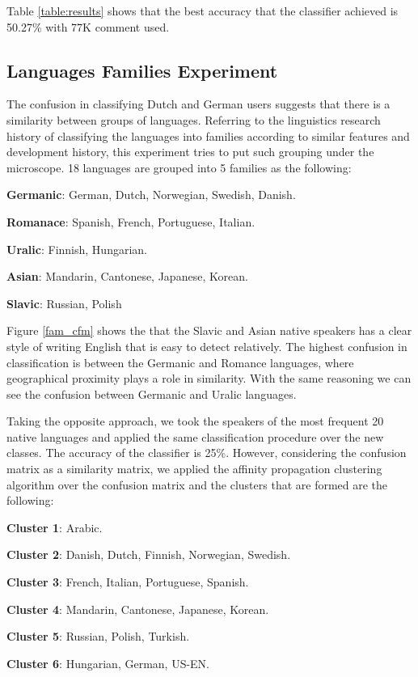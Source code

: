 \documentclass[10pt,a5paper,twoside]{article}
\begin{document}
Table \ref{table:results} shows that the best accuracy that the classifier achieved is 50.27\% with 77K comment used. 
\subsection{Languages Families Experiment}

The confusion in classifying Dutch and German users suggests that there is a similarity between groups of languages. Referring to the linguistics research history of classifying the languages into families according to similar features and development history, this experiment tries to put such grouping under the microscope. 18 languages are grouped into 5 families as the following:
\begin{compactitem}
\item \textbf{Germanic}: German, Dutch, Norwegian, Swedish, Danish.
\item \textbf{Romanace}: Spanish, French, Portuguese, Italian.
\item \textbf{Uralic}: Finnish, Hungarian.
\item \textbf{Asian}: Mandarin, Cantonese, Japanese, Korean.
\item \textbf{Slavic}: Russian, Polish
\end{compactitem}

Figure \ref{fam_cfm} shows the that the Slavic and Asian native speakers has a clear style of writing English that is easy to detect relatively. The highest confusion in classification is between the Germanic and Romance languages, where geographical proximity plays a role in similarity. With the same reasoning we can see the confusion between Germanic and Uralic languages.


Taking the opposite approach, we took the speakers of the most frequent 20
native languages and applied the same classification procedure over the new
classes. The accuracy of the classifier is 25\%. However, considering the
confusion matrix as a similarity matrix, we applied the affinity propagation
clustering algorithm\cite{sklearn} over the confusion matrix and the clusters that are formed are the following:
\begin{compactitem}
\item \textbf{Cluster 1}: Arabic.
\item \textbf{Cluster 2}: Danish, Dutch, Finnish, Norwegian, Swedish.
\item \textbf{Cluster 3}: French, Italian, Portuguese, Spanish.
\item \textbf{Cluster 4}: Mandarin, Cantonese, Japanese, Korean.
\item \textbf{Cluster 5}: Russian, Polish, Turkish.
\item \textbf{Cluster 6}: Hungarian, German, US-EN.
\end{compactitem}
\end{document}
